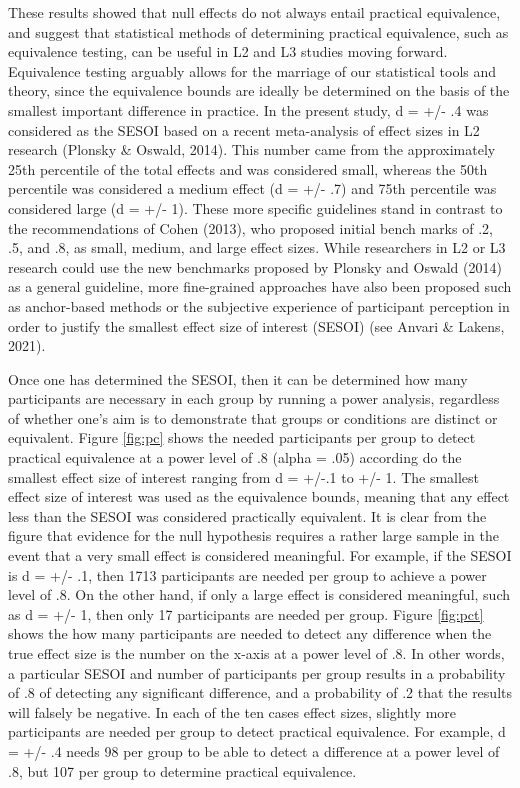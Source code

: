 \documentclass[
  man,floatsintext]{apa6}
\begin{document}
These results showed that null effects do not always entail practical equivalence, and suggest that statistical methods of determining practical equivalence, such as equivalence testing, can be useful in L2 and L3 studies moving forward.
Equivalence testing arguably allows for the marriage of our statistical tools and theory, since the equivalence bounds are ideally be determined on the basis of the smallest important difference in practice.
In the present study, d = +/- .4 was considered as the SESOI based on a recent meta-analysis of effect sizes in L2 research (Plonsky \& Oswald, 2014).
This number came from the approximately 25th percentile of the total effects and was considered small, whereas the 50th percentile was considered a medium effect (d = +/- .7) and 75th percentile was considered large (d = +/- 1).
These more specific guidelines stand in contrast to the recommendations of Cohen (2013), who proposed initial bench marks of .2, .5, and .8, as small, medium, and large effect sizes.
While researchers in L2 or L3 research could use the new benchmarks proposed by Plonsky and Oswald (2014) as a general guideline, more fine-grained approaches have also been proposed such as anchor-based methods or the subjective experience of participant perception in order to justify the smallest effect size of interest (SESOI) (see Anvari \& Lakens, 2021).

Once one has determined the SESOI, then it can be determined how many participants are necessary in each group by running a power analysis, regardless of whether one's aim is to demonstrate that groups or conditions are distinct or equivalent.
Figure \ref{fig:pc} shows the needed participants per group to detect practical equivalence at a power level of .8 (alpha = .05) according do the smallest effect size of interest ranging from d = +/-.1 to +/- 1.
The smallest effect size of interest was used as the equivalence bounds, meaning that any effect less than the SESOI was considered practically equivalent.
It is clear from the figure that evidence for the null hypothesis requires a rather large sample in the event that a very small effect is considered meaningful.
For example, if the SESOI is d = +/- .1, then 1713 participants are needed per group to achieve a power level of .8.
On the other hand, if only a large effect is considered meaningful, such as d = +/- 1, then only 17 participants are needed per group.
Figure \ref{fig:pct} shows the how many participants are needed to detect any difference when the true effect size is the number on the x-axis at a power level of .8.
In other words, a particular SESOI and number of participants per group results in a probability of .8 of detecting any significant difference, and a probability of .2 that the results will falsely be negative.
In each of the ten cases effect sizes, slightly more participants are needed per group to detect practical equivalence.
For example, d = +/- .4 needs 98 per group to be able to detect a difference at a power level of .8, but 107 per group to determine practical equivalence.
\end{document}
